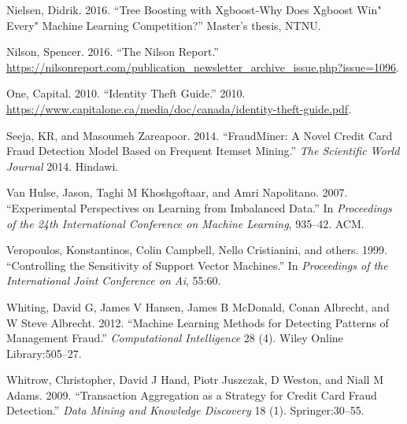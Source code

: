 \documentclass[12pt,]{article}
\begin{document}
\leavevmode\hypertarget{ref-nielsen2016tree}{}%
Nielsen, Didrik. 2016. ``Tree Boosting with Xgboost-Why Does Xgboost
Win" Every" Machine Learning Competition?'' Master's thesis, NTNU.

\leavevmode\hypertarget{ref-nilson2016nilson}{}%
Nilson, Spencer. 2016. ``The Nilson Report.''
\url{https://nilsonreport.com/publication_newsletter_archive_issue.php?issue=1096}.

\leavevmode\hypertarget{ref-capitaloneguide}{}%
One, Capital. 2010. ``Identity Theft Guide.'' 2010.
\url{https://www.capitalone.ca/media/doc/canada/identity-theft-guide.pdf}.

\leavevmode\hypertarget{ref-seeja2014fraudminer}{}%
Seeja, KR, and Masoumeh Zareapoor. 2014. ``FraudMiner: A Novel Credit
Card Fraud Detection Model Based on Frequent Itemset Mining.'' \emph{The
Scientific World Journal} 2014. Hindawi.

\leavevmode\hypertarget{ref-van2007experimental}{}%
Van Hulse, Jason, Taghi M Khoshgoftaar, and Amri Napolitano. 2007.
``Experimental Perspectives on Learning from Imbalanced Data.'' In
\emph{Proceedings of the 24th International Conference on Machine
Learning}, 935--42. ACM.

\leavevmode\hypertarget{ref-veropoulos1999controlling}{}%
Veropoulos, Konstantinos, Colin Campbell, Nello Cristianini, and others.
1999. ``Controlling the Sensitivity of Support Vector Machines.'' In
\emph{Proceedings of the International Joint Conference on Ai}, 55:60.

\leavevmode\hypertarget{ref-whiting2012machine}{}%
Whiting, David G, James V Hansen, James B McDonald, Conan Albrecht, and
W Steve Albrecht. 2012. ``Machine Learning Methods for Detecting
Patterns of Management Fraud.'' \emph{Computational Intelligence} 28
(4). Wiley Online Library:505--27.

\leavevmode\hypertarget{ref-whitrow2009transaction}{}%
Whitrow, Christopher, David J Hand, Piotr Juszczak, D Weston, and Niall
M Adams. 2009. ``Transaction Aggregation as a Strategy for Credit Card
Fraud Detection.'' \emph{Data Mining and Knowledge Discovery} 18 (1).
Springer:30--55.
\end{document}
